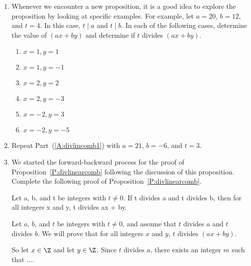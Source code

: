 \begin{activity} \label{A:divlincomb} \hfill
\begin{enumerate}
\item Whenever we encounter a new proposition, it is a good idea to explore the proposition by looking at specific examples.  For example, let  \linebreak
$a = 20$, $b = 12$, and  $t = 4$.  In this case,  $t \mid a$  and  $t \mid b$.  In each of the following cases, determine the value of  $\left(ax + by\right)$ and determine if $t$ divides 
$\left(ax + by\right)$.  \label{A:divlincomb1}

\begin{multicols}{3}
\begin{enumerate}
\item $x=1, y=1$
\item $x=1, y=-1$
\item $x=2, y=2$
\item $x=2, y=-3$
\item $x=-2, y=3$
\item $x=-2, y=-5$
\end{enumerate}
\end{multicols}

\item Repeat Part~(\ref{A:divlincomb1}) with  $a = 21$, $b =  - 6$, and  $t = 3$.

\item We started the forward-backward process for the proof of Proposition~\ref{P:divlinearcomb} following the discussion of this proposition.  Complete the following proof of Proposition~\ref{P:divlinearcomb}.
%
\addtocounter{theorem}{-2}
\begin{proposition}
Let a, b, and  t  be integers with $t \ne 0$.  If  t  divides  a  and  t  divides  b, then for all integers  x  and  y,  t  divides  ax + by.
\end{proposition}
%
\begin{myproof}
Let $a$, $b$, and  $t$  be integers with $t \ne 0$, and assume that $t$  divides  $a$  and  $t$  divides  $b$.  We will prove that for all integers  $x$  and  $y$,  $t$  divides  
$\left(ax + by\right)$.

So let  $x \in \Z$ and let  $y \in \Z$.  Since  $t$  divides  $a$, there exists an integer  $m$  such that $ \ldots .$
\end{myproof}
\end{enumerate}
\end{activity}
\hbreak
\addtocounter{theorem}{1}

